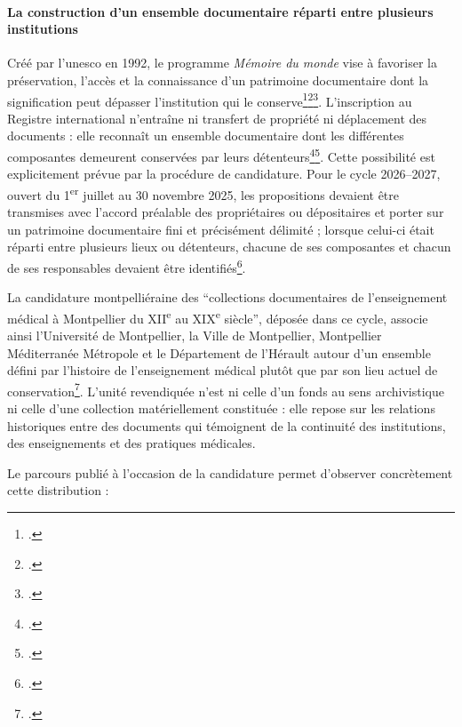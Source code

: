 \paragraph{La construction d'un ensemble documentaire réparti entre plusieurs institutions}

Créé par l'\gls{unesco} en 1992, le programme \emph{Mémoire du monde} vise à favoriser la préservation, l'accès et la connaissance d'un patrimoine documentaire dont la signification peut dépasser l'institution qui le conserve\footcite{UNESCOMemoireMonde}\footcite{Grunberg2016}\footcite{MaurelMemoireMonde2020}. L'inscription au Registre international n'entraîne ni transfert de propriété ni déplacement des documents : elle reconnaît un ensemble documentaire dont les différentes composantes demeurent conservées par leurs détenteurs\footcite{UNESCORegistreMemoireMonde}\footcite{WilsonMemoryWorld2019}. Cette possibilité est explicitement prévue par la procédure de candidature. Pour le cycle 2026--2027, ouvert du 1\textsuperscript{er} juillet au 30 novembre 2025, les propositions devaient être transmises avec l'accord préalable des propriétaires ou dépositaires et porter sur un patrimoine documentaire fini et précisément délimité ; lorsque celui-ci était réparti entre plusieurs lieux ou détenteurs, chacune de ses composantes et chacun de ses responsables devaient être identifiés\footcite{UNESCOAppel2026_2027}.

La candidature montpelliéraine des \enquote{collections documentaires de l'enseignement médical à Montpellier du XII\textsuperscript{e} au XIX\textsuperscript{e} siècle}, déposée dans ce cycle, associe ainsi l'Université de Montpellier, la Ville de Montpellier, Montpellier Méditerranée Métropole et le Département de l'Hérault autour d'un ensemble défini par l'histoire de l'enseignement médical plutôt que par son lieu actuel de conservation\footcite{ParcoursCandidatureUNESCO2025}. L'unité revendiquée n'est ni celle d'un fonds au sens archivistique ni celle d'une collection matériellement constituée : elle repose sur les relations historiques entre des documents qui témoignent de la continuité des institutions, des enseignements et des pratiques médicales.

Le parcours publié à l'occasion de la candidature permet d'observer concrètement cette distribution :

